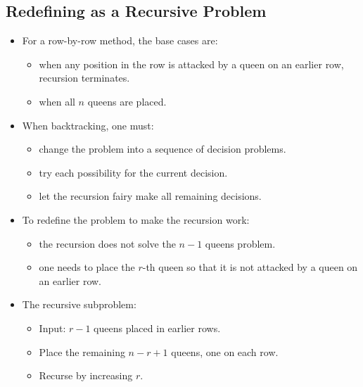 \documentclass[12pt]{article}
\begin{document}
\subsection{Redefining as a Recursive Problem}
\begin{itemize}
    \item For a row-by-row method, the base cases are:
    \begin{itemize}
        \item when any position in the row is attacked by a queen on an earlier row, recursion terminates.
        \item when all $n$ queens are placed.
    \end{itemize}
    \item When backtracking, one must:
    \begin{itemize}
        \item change the problem into a sequence of decision problems.
        \item try each possibility for the current decision.
        \item let the recursion fairy make all remaining decisions.
    \end{itemize}
    \item To redefine the problem to make the recursion work:
    \begin{itemize}
        \item the recursion does not solve the $n - 1$ queens problem.
        \item one needs to place the $r$-th queen so that it is not attacked by a queen on an earlier row.
    \end{itemize}
    \item The recursive subproblem:
    \begin{itemize}
        \item Input: $r - 1$ queens placed in earlier rows.
        \item Place the remaining $n - r + 1$ queens, one on each row.
        \item Recurse by increasing $r$.
    \end{itemize}
\end{itemize}
\end{document}
